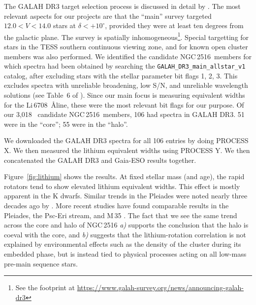 \documentclass[12pt,twocolumn,tighten]{aastex63}
\newcommand{\cn}{NGC\,2516} %
\newcommand{\nkinematic}{3{,}018\ } %
\begin{document}
The GALAH DR3 target selection process is discussed in detail by
\citet{buder_galah_2020}.  The most relevant aspects for our projects
are that the ``main'' survey targeted $12.0<V<14.0$ stars at
$\delta<+10^\circ$, provided they were at least ten degrees from the
galactic plane.  The survey is spatially inhomogeneous\footnote{See
the footprint at
\url{https://www.galah-survey.org/news/announcing-galah-dr3}}. Special
targetting for stars in the TESS southern continuous viewing zone, and
for known open cluster members was also performed.  We identified the
candidate \cn\ members
for which spectra had been obtained by searching
the \texttt{GALAH\_DR3\_main\_allstar\_v1} catalog, after excluding
stars with the stellar parameter bit flags 1, 2, 3.  This excludes
spectra with unreliable broadening, low S/N, and unreliable wavelength
solutions (see Table~6 of \citealt{buder_galah_2020}).  Since our main
focus is measuring equivalent widths for the Li\,6708\ \AA line, these
were the most relevant bit flags for our purpose.  Of our \nkinematic
candidate \cn\ members, 106 had spectra in GALAH DR3.  51 were in the
``core''; 55 were in the ``halo''.

We downloaded the GALAH DR3 spectra for all 106 entries by doing PROCESS X.
We then measured the lithium equivalent widths using PROCESS Y.
We then concatenated the GALAH DR3 and Gaia-ESO results together.

Figure~\ref{fig:lithium} shows the results.  At fixed stellar mass
(and age), the rapid rotators tend to show elevated lithium equivalent
widths. This effect is mostly apparent in the K dwarfs.  Similar
trends in the Pleiades were noted nearly three decades ago by
\citet{soderblom_evolution_1993}.  More recent studies have found
comparable results in the Pleiades, the Psc-Eri stream, and M\,35
\citep{bouvier_pleiades_lirot_2018,arancibia_2020,jeffries_m35_li_2020}.
The fact that we see the same trend across the core and halo of \cn
{\it a)} supports the conclusion that the halo is coeval with the
core, and {\it b)} suggests that the lithium-rotation correlation is
not explained by environmental effects such as the density of the cluster
during its embedded phase, but is instead tied to physical processes
acting on all low-mass pre-main sequence stars.
\end{document}
